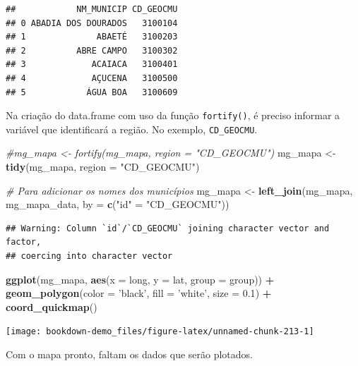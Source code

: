 \documentclass[]{book}
\newenvironment{Shaded}{\begin{snugshade}}{\end{snugshade}}
\newcommand{\KeywordTok}[1]{\textcolor[rgb]{0.13,0.29,0.53}{\textbf{#1}}}
\newcommand{\DataTypeTok}[1]{\textcolor[rgb]{0.13,0.29,0.53}{#1}}
\newcommand{\FloatTok}[1]{\textcolor[rgb]{0.00,0.00,0.81}{#1}}
\newcommand{\StringTok}[1]{\textcolor[rgb]{0.31,0.60,0.02}{#1}}
\newcommand{\CommentTok}[1]{\textcolor[rgb]{0.56,0.35,0.01}{\textit{#1}}}
\newcommand{\OperatorTok}[1]{\textcolor[rgb]{0.81,0.36,0.00}{\textbf{#1}}}
\newcommand{\NormalTok}[1]{#1}
\begin{document}
\begin{verbatim}
##            NM_MUNICIP CD_GEOCMU
## 0 ABADIA DOS DOURADOS   3100104
## 1              ABAETÉ   3100203
## 2          ABRE CAMPO   3100302
## 3             ACAIACA   3100401
## 4             AÇUCENA   3100500
## 5            ÁGUA BOA   3100609
\end{verbatim}

Na criação do data.frame com uso da função \texttt{fortify()}, é preciso
informar a variável que identificará a região. No exemplo,
\texttt{CD\_GEOCMU}.

\begin{Shaded}
\begin{Highlighting}[]
\CommentTok{#mg_mapa <- fortify(mg_mapa, region = "CD_GEOCMU")}
\NormalTok{mg_mapa <-}\StringTok{ }\KeywordTok{tidy}\NormalTok{(mg_mapa, }\DataTypeTok{region =} \StringTok{"CD_GEOCMU"}\NormalTok{)}

\CommentTok{# Para adicionar os nomes dos municípios}
\NormalTok{mg_mapa <-}\StringTok{ }\KeywordTok{left_join}\NormalTok{(mg_mapa, mg_mapa_data, }\DataTypeTok{by =} \KeywordTok{c}\NormalTok{(}\StringTok{"id"}\NormalTok{ =}\StringTok{ "CD_GEOCMU"}\NormalTok{))}
\end{Highlighting}
\end{Shaded}

\begin{verbatim}
## Warning: Column `id`/`CD_GEOCMU` joining character vector and factor,
## coercing into character vector
\end{verbatim}

\begin{Shaded}
\begin{Highlighting}[]
\KeywordTok{ggplot}\NormalTok{(mg_mapa, }\KeywordTok{aes}\NormalTok{(}\DataTypeTok{x =}\NormalTok{ long, }\DataTypeTok{y =}\NormalTok{ lat, }\DataTypeTok{group =}\NormalTok{ group)) }\OperatorTok{+}
\StringTok{  }\KeywordTok{geom_polygon}\NormalTok{(}\DataTypeTok{color =} \StringTok{'black'}\NormalTok{, }\DataTypeTok{fill =} \StringTok{'white'}\NormalTok{, }\DataTypeTok{size =} \FloatTok{0.1}\NormalTok{) }\OperatorTok{+}
\StringTok{  }\KeywordTok{coord_quickmap}\NormalTok{()}
\end{Highlighting}
\end{Shaded}

\begin{center}\texttt{[image: bookdown-demo\_files/figure-latex/unnamed-chunk-213-1]} \end{center}

Com o mapa pronto, faltam os dados que serão plotados.
\end{document}
